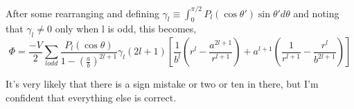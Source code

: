 \documentclass[10pt,a4paper]{article}
\begin{document}
After some rearranging and defining $\gamma_l\equiv\int_0^{\pi/2}P_l(\cos\theta')\sin\theta'd\theta$ and noting that $\gamma_l\neq0$ only when l is odd, this becomes,
\begin{equation}\boxed{
\Phi =\frac{-V}{2}\sum_{l odd}\frac{P_l(\cos\theta)}{1-(\frac{a}{b})^{2l+1}}\gamma_l(2l+1)\left[
\frac{1}{b^l}\left(r^l-\frac{a^{2l+1}}{r^{l+1}}\right)+a^{l+1}\left(\frac{1}{r^{l+1}}-\frac{r^l}{b^{2l+1}}\right)
\right]
}\end{equation}

It's very likely that there is a sign mistake or two or ten in there, but I'm confident that everything else is correct.
\end{document}
